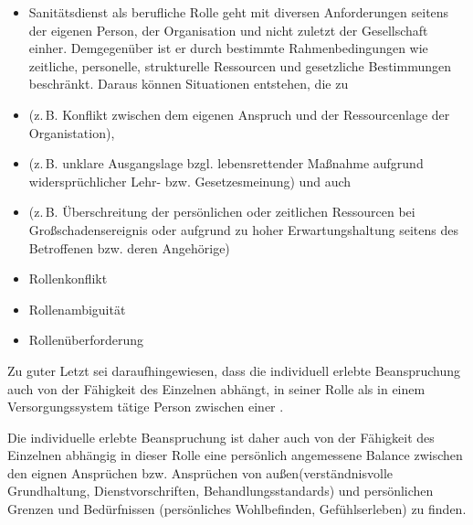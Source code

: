 {
\begin{itemize}
  \item
  Sanitätsdienst als berufliche Rolle geht mit diversen
  Anforderungen seitens der eigenen Person, der Organisation
  und nicht zuletzt der Gesellschaft einher. Demgegenüber ist
  er durch bestimmte Rahmenbedingungen wie zeitliche,
  personelle, strukturelle Ressourcen und gesetzliche
  Bestimmungen beschränkt. Daraus können Situationen
  entstehen, die zu
  \item {} (z.\,B. Konflikt
  zwischen dem eigenen Anspruch und der Ressourcenlage der
  Organistation),
  \item {}  (z.\,B. unklare
  Ausgangslage bzgl. lebensrettender Maßnahme aufgrund
  widersprüchlicher Lehr- bzw. Gesetzesmeinung) und auch
  \item
   (z.\,B. Überschreitung der
  persönlichen oder zeitlichen Ressourcen bei
  Großschadensereignis oder aufgrund zu hoher
  Erwartungshaltung seitens des Betroffenen bzw. deren
  Angehörige)
\end{itemize}
}
{\begin{itemize}
  \item {Rollenkonflikt}
  \item {Rollenambiguität}
  \item {Rollenüberforderung}
\end{itemize}}
{}
{}
{}



Zu guter Letzt sei daraufhingewiesen, dass die individuell
erlebte Beanspruchung auch von der Fähigkeit des Einzelnen
abhängt, in seiner Rolle als in einem Versorgungssystem 
tätige Person 
zwischen einer .

Die individuelle erlebte Beanspruchung ist daher auch von der Fähigkeit des Einzelnen abhängig in dieser Rolle eine persönlich angemessene Balance zwischen den eignen Ansprüchen bzw. Ansprüchen von außen(verständnisvolle Grundhaltung, Dienstvorschriften, Behandlungsstandards) und persönlichen Grenzen und Bedürfnissen (persönliches Wohlbefinden, Gefühlserleben) zu finden.

